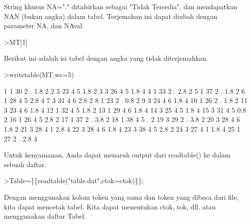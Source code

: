 \documentclass[12pt,Times new roman,letterpaper]{book}
\begin{document}
\begin{eulernootebook}
\begin{eulercomment}
\begin{eulercomment}
\begin{eulernootebook}
\begin{eulercomment}
\begin{eulercomment}
\begin{eulercomment}
\begin{eulercomment}
\begin{eulercomment}
\begin{eulercomment}
\begin{eulercomment}
\begin{eulercomment}
String khusus NA="." ditafsirkan sebagai "Tidak Tersedia", dan
mendapatkan NAN (bukan angka) dalam tabel. Terjemahan ini dapat diubah
dengan parameter NA, dan NAval.
\end{eulercomment}
\begin{eulerprompt}
>MT[1]
\end{eulerprompt}
\begin{euleroutput}
  [1,  1,  30,  2,  NAN,  1.8,  2]
\end{euleroutput}
\begin{eulercomment}
Berikut ini adalah isi tabel dengan angka yang tidak diterjemahkan.
\end{eulercomment}
\begin{eulerprompt}
>writetable(MT,wc=5)
\end{eulerprompt}
\begin{euleroutput}
      1    1   30    2    .  1.8    2
      2    3   23    4    5  1.8    2
      3    3   26    4    5  1.8    4
      4    1   33    2    .  2.8    2
      5    1   37    2    .  1.8    2
      6    1   28    4    5  2.8    4
      7    3   31    4    6  2.8    2
      8    1   23    2    .  0.8    2
      9    3   24    4    6  1.8    4
     10    1   26    2    .  1.8    2
     11    3   23    4    6  1.8    4
     12    1   32    4    5  1.8    2
     13    1   29    4    6  1.8    4
     14    3   25    4    5  1.8    4
     15    3   31    4    5  0.8    2
     16    1   26    4    5  2.8    2
     17    1   37    2    .  3.8    2
     18    1   38    4    5    .    2
     19    3   29    2    .  3.8    2
     20    3   28    4    6  1.8    2
     21    3   28    4    1  2.8    4
     22    3   28    4    6  1.8    4
     23    3   38    4    5  2.8    2
     24    3   27    4    1  1.8    4
     25    1   27    2    .  2.8    4
\end{euleroutput}
\begin{eulercomment}
Untuk kenyamanan, Anda dapat menaruh output dari readtable() ke dalam
sebuah daftar.
\end{eulercomment}
\begin{eulerprompt}
>Table=\{\{readtable("table.dat",ctok=ctok)\}\};
\end{eulerprompt}
\begin{eulercomment}
Dengan menggunakan kolom token yang sama dan token yang dibaca dari
file, kita dapat mencetak tabel. Kita dapat menentukan ctok, tok, dll.
atau menggunakan daftar Tabel.
\end{eulercomment}
\begin{eulerprompt}

\end{eulerprompt}
\end{eulercomment}
\end{eulercomment}
\end{eulercomment}
\end{eulercomment}
\end{eulercomment}
\end{eulercomment}
\end{eulercomment}
\end{eulernootebook}
\end{eulercomment}
\end{eulercomment}
\end{eulernootebook}
\end{document}

